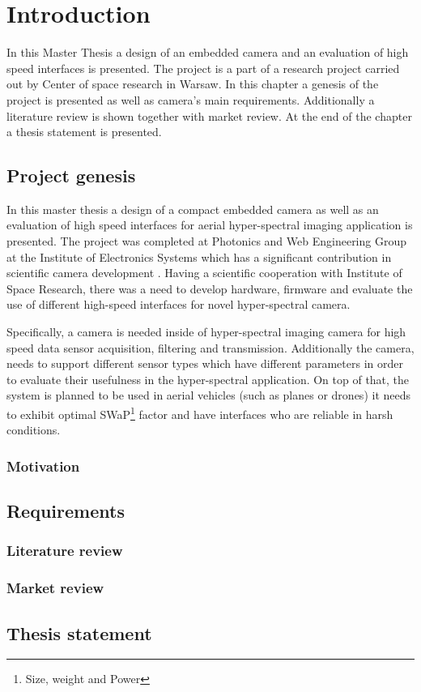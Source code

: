\pagestyle{plain}
\chapter{Introduction}
In this Master Thesis a design of an embedded camera and an evaluation of high speed interfaces is presented. The project is a part of a research project carried out by Center of space research in Warsaw. In this chapter a genesis of the project is presented as well as camera's main requirements. Additionally a literature review is shown together with market review. At the end of the chapter a thesis statement is presented.


\section{Project genesis}

In this master thesis a design of a compact embedded camera as well as an evaluation of high speed interfaces for aerial hyper-spectral imaging application is presented. 
The project was completed at Photonics and Web Engineering Group at the Institute of 
Electronics Systems which has a significant contribution in scientific camera development \cite{PUB:KASPROWICZ_PI}.  Having a scientific cooperation with
Institute of Space Research, there was a need to develop hardware, firmware and evaluate the use of different high-speed interfaces for novel hyper-spectral camera.

Specifically, a camera is needed inside of hyper-spectral imaging camera for high speed data sensor acquisition, filtering and transmission. Additionally the camera, needs to support different sensor types which have different parameters in order to evaluate their usefulness in the hyper-spectral application. On top of that, the system is planned to be used in aerial vehicles (such as planes or drones) it needs to exhibit optimal SWaP\footnote{Size, weight and Power} factor and have interfaces who are reliable in harsh conditions. 

\subsection{Motivation}
\section{Requirements}
\subsection{Literature review}
\subsection{Market review} 

\section{Thesis statement} 
